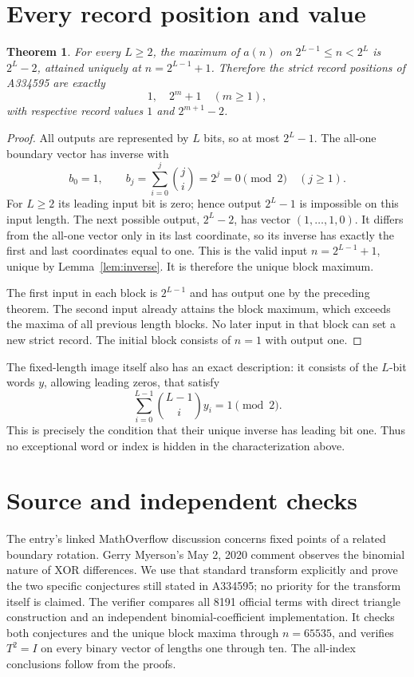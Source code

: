 \documentclass[10pt]{article}
\newtheorem{theorem}{Theorem}
\begin{document}
\section{Every record position and value}
\begin{theorem}\label{thm:records}
For every $L\ge2$, the maximum of $a(n)$ on
$2^{L-1}\le n<2^L$ is $2^L-2$, attained uniquely at
$n=2^{L-1}+1$. Therefore the strict record positions of A334595
are exactly
\[
 1,\quad 2^m+1\quad(m\ge1),
\]
with respective record values $1$ and $2^{m+1}-2$.
\end{theorem}
\begin{proof}
All outputs are represented by $L$ bits, so at most $2^L-1$.
The all-one boundary vector has inverse with
\[
 b_0=1,\qquad b_j=\sum_{i=0}^j\binom ji=2^j=0\pmod2
 \quad(j\ge1).
\]
For $L\ge2$ its leading input bit is zero; hence output $2^L-1$
is impossible on this input length. The next possible output,
$2^L-2$, has vector $(1,\ldots,1,0)$. It differs from the
all-one vector only in its last coordinate, so its inverse has
exactly the first and last coordinates equal to one.
This is the valid input $n=2^{L-1}+1$, unique by
Lemma~\ref{lem:inverse}. It is therefore the unique block maximum.

The first input in each block is $2^{L-1}$ and has output one
by the preceding theorem. The second input already attains the
block maximum, which exceeds the maxima of all previous length
blocks. No later input in that block can set a new strict record.
The initial block consists of $n=1$ with output one.
\end{proof}

The fixed-length image itself also has an exact description:
it consists of the $L$-bit words $y$, allowing leading zeros,
that satisfy
\[
 \sum_{i=0}^{L-1}\binom{L-1}{i}y_i=1\pmod2.
\]
This is precisely the condition that their unique inverse has
leading bit one. Thus no exceptional word or index is hidden in
the characterization above.

\section{Source and independent checks}
The entry's linked MathOverflow discussion concerns fixed points
of a related boundary rotation. Gerry Myerson's May 2, 2020
comment observes the binomial nature of XOR differences. We use
that standard transform explicitly and prove the two specific
conjectures still stated in A334595; no priority for the transform
itself is claimed.
The verifier compares all 8191 official terms with direct triangle
construction and an independent binomial-coefficient implementation.
It checks both conjectures and the unique block maxima through
$n=65535$, and verifies $T^2=I$ on every binary vector of lengths
one through ten. The all-index conclusions follow from the proofs.
\end{document}
